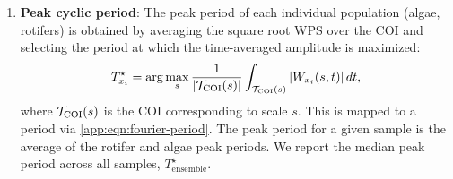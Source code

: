 \begin{enumerate}
    \item \textbf{Peak cyclic period}: The peak period of each individual population (algae, rotifers) is obtained by averaging the square root WPS over the COI and selecting the period at which the time-averaged amplitude is maximized:
    \begin{equation}\label{app:eqn:max-period}
        T^{\star}_{x_i} = \arg\max_s \frac{1}{|\mathcal{T}_{\mathrm{COI}}(s)|} \int_{\mathcal{T}_{\mathrm{COI}}(s)} |W_{x_i}(s, t)| \, dt,
    \end{equation}
    where $\mathcal{T}_{\mathrm{COI}}(s)$ is the COI corresponding to scale $s$. This is mapped to a period via \cref{app:eqn:fourier-period}. 
    The peak period for a given sample is the average of the rotifer and algae peak periods.
    We report the median peak period across all samples, $T^\star_{\mathrm{ensemble}}$.
    

\end{enumerate}

